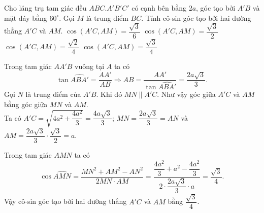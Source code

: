 \begin{ex}%
 Cho lăng trụ tam giác đều $ABC.A'B'C'$ có cạnh bên bằng $2a$, góc tạo bởi $A'B$ và mặt đáy bằng $60^\circ$. Gọi $M$ là trung điểm $BC$. Tính cô-sin góc tạo bởi hai đường thẳng $A'C$ và $AM$.
 \choice
  {$\cos(A'C,AM) = \dfrac{\sqrt{3}}{6}$}
  {$\cos(A'C,AM) = \dfrac{\sqrt{3}}{2}$}
  {$\cos(A'C,AM) = \dfrac{\sqrt{2}}{4}$}
  {\True $\cos(A'C,AM) = \dfrac{\sqrt{3}}{4}$}
 \loigiai
  {
  \immini
  {
  Trong tam giác $AA'B$ vuông tại $A$ ta có
  $$\tan \widehat{ABA'} = \dfrac{AA'}{AB} \Rightarrow AB = \dfrac{AA'}{\tan \widehat{ABA'}} = \dfrac{2a\sqrt{3}}{3}.$$
  Gọi $N$ là trung điểm của $A'B$. Khi đó $MN \parallel A'C$. Như vậy góc giữa $A'C$ và $AM$ bằng góc giữa $MN$ và $AM$.\\
  Ta có $A'C = \sqrt{4a^2 + \dfrac{4a^2}{3}} = \dfrac{4a\sqrt{3}}{3}$; $MN = \dfrac{2a\sqrt{3}}{3} = AN$ và $AM = \dfrac{2a\sqrt{3}}{3} \cdot \dfrac{\sqrt{3}}{2} = a$.
  }
  {
  }
  \noindent
  Trong tam giác $AMN$ ta có
  $$\cos \widehat{AMN} = \dfrac{MN^2 + AM^2 - AN^2}{2MN \cdot AM} = \dfrac{\dfrac{4a^2}{3} + a^2 - \dfrac{4a^2}{3}}{2 \cdot \dfrac{2a\sqrt{3}}{3} \cdot a} = \dfrac{\sqrt{3}}{4}.$$
  Vậy cô-sin góc tạo bởi hai đường thẳng $A'C$ và $AM$ bằng $\dfrac{\sqrt{3}}{4}$.
  }
\end{ex}


